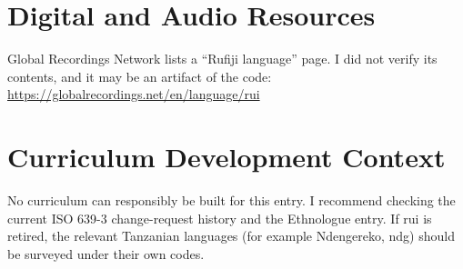 \documentclass[12pt]{article}
\begin{document}
\section{Digital and Audio Resources}
Global Recordings Network lists a ``Rufiji language'' page. I did not verify its contents, and it may be an artifact of the code: \url{https://globalrecordings.net/en/language/rui}

\section{Curriculum Development Context}
No curriculum can responsibly be built for this entry. I recommend checking the current ISO 639-3 change-request history and the Ethnologue entry. If rui is retired, the relevant Tanzanian languages (for example Ndengereko, ndg) should be surveyed under their own codes.
\end{document}
